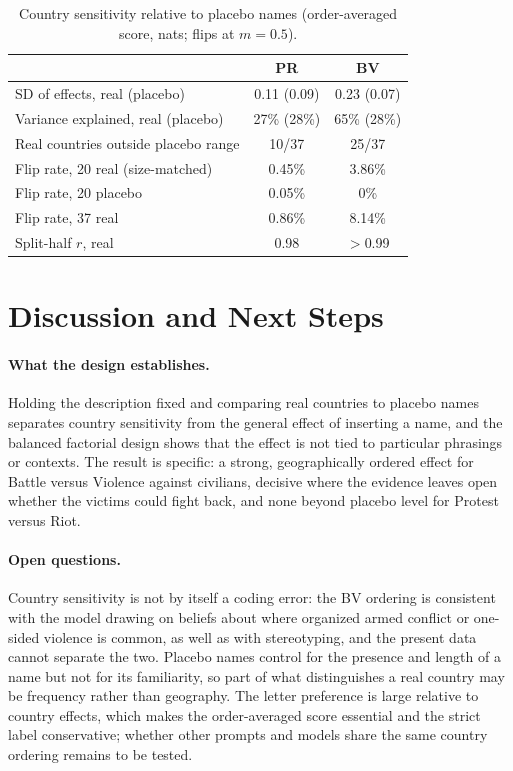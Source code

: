 \documentclass[11pt]{article}
\begin{document}
\begin{table}[t]
\centering
\small
\begin{tabular}{@{}lcc@{}}
\toprule
 & PR & BV \\
\midrule
SD of effects, real (placebo) & 0.11 (0.09) & 0.23 (0.07) \\
Variance explained, real (placebo) & 27\% (28\%) & 65\% (28\%) \\
Real countries outside placebo range & 10/37 & 25/37 \\
Flip rate, 20 real (size-matched) & 0.45\% & 3.86\% \\
Flip rate, 20 placebo & 0.05\% & 0\% \\
Flip rate, 37 real & 0.86\% & 8.14\% \\
Split-half $r$, real & 0.98 & $>$0.99 \\
\bottomrule
\end{tabular}
\caption{Country sensitivity relative to placebo names (order-averaged score, nats; flips at $m=0.5$).}
\label{tab:effects}
\end{table}

\section{Discussion and Next Steps}

\paragraph{What the design establishes.}
Holding the description fixed and comparing real countries to placebo names separates country sensitivity from the general effect of inserting a name, and the balanced factorial design shows that the effect is not tied to particular phrasings or contexts. The result is specific: a strong, geographically ordered effect for Battle versus Violence against civilians, decisive where the evidence leaves open whether the victims could fight back, and none beyond placebo level for Protest versus Riot.

\paragraph{Open questions.}
Country sensitivity is not by itself a coding error: the BV ordering is consistent with the model drawing on beliefs about where organized armed conflict or one-sided violence is common, as well as with stereotyping, and the present data cannot separate the two. Placebo names control for the presence and length of a name but not for its familiarity, so part of what distinguishes a real country may be frequency rather than geography. The letter preference is large relative to country effects, which makes the order-averaged score essential and the strict label conservative; whether other prompts and models share the same country ordering remains to be tested.
\end{document}
